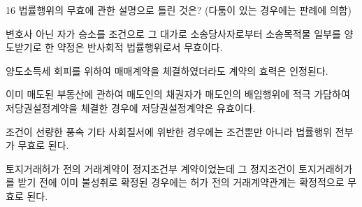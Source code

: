 \begin{question}{16}
법률행위의 무효에 관한 설명으로 틀린 것은? (다툼이 있는 경우에는 판례에 의함)
\begin{choices}
  \item 변호사 아닌 자가 승소를 조건으로 그 대가로 소송당사자로부터 소송목적물 일부를 양도받기로 한 약정은 반사회적 법률행위로서 무효이다.
  \item 양도소득세 회피를 위하여 매매계약을 체결하였더라도 계약의 효력은 인정된다.
  \item 이미 매도된 부동산에 관하여 매도인의 채권자가 매도인의 배임행위에 적극 가담하여 저당권설정계약을 체결한 경우에 저당권설정계약은 유효이다.
  \item 조건이 선량한 풍속 기타 사회질서에 위반한 경우에는 조건뿐만 아니라 법률행위 전부가 무효로 된다.
  \item 토지거래허가 전의 거래계약이 정지조건부 계약이었는데 그 정지조건이 토지거래허가를 받기 전에 이미 불성취로 확정된 경우에는 허가 전의 거래계약관계는 확정적으로 무효로 된다.
\end{choices}
\end{question}
